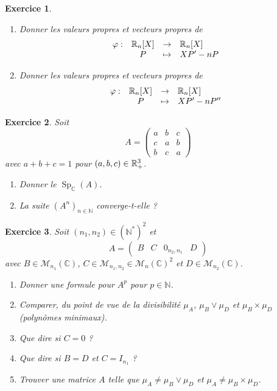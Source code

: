 \documentclass[12pt]{article}
\newtheorem{exercise}{Exercice}[section]
\theoremstyle{remark}
\theoremstyle{remark}
\newcommand{\C}{\mathbb{C}} \newcommand{\Q}{\mathbb{Q}}
\newcommand{\N}{\mathbb{N}} \newcommand{\Z}{\mathbb{Z}}
\newcommand{\M}{\mathcal{M}} \renewcommand{\L}{\mathcal{L}}
\DeclareMathOperator{\Sp}{Sp} \DeclareMathOperator{\mat}{mat}
\newcommand{\function}[5]{
	$$
	\begin{array}{rccl}
		#1: & #2 & \to & #3 \\
		& #4 & \mapsto & #5
	\end{array}
	$$
}
\begin{document}
\begin{exercise}
	\phantom{}
	\begin{enumerate}
		\item Donner les valeurs propres et vecteurs propres de \function{\varphi}{\R_n[X]}{\R_n[X]}{P}{XP'-nP}
		\item Donner les valeurs propres et vecteurs propres de \function{\varphi}{\R_n[X]}{\R_n[X]}{P}{XP'-nP''}
	\end{enumerate}
\end{exercise}

\begin{exercise}
	Soit 
	$$
	A=
	\begin{pmatrix}
		a & b & c\\
		c & a & b\\
		b & c & a
	\end{pmatrix}
	$$
	avec $a+b+c=1$ pour $(a,b,c)\in\mathbb{R}_{+}^{3}$.
	\begin{enumerate}
		\item Donner le $\Sp_{\C}(A)$.
		\item La suite $(A^{n})_{n\in\N}$ converge-t-elle ?
	\end{enumerate}
\end{exercise}

\begin{exercise}
	Soit $(n_{1},n_{2})\in(\N^{*})^{2}$ et
	$$
	A=
	\begin{pmatrix}
		B & C &
		0_{n_{2},n_{1}} & D
	\end{pmatrix}
	$$
	avec $B\in\M_{n_{1}}(\C)$, $C\in\M_{n_{1},n_{2}}\in\M_{n}(\C)^{2}$ et $D\in\M_{n_{2}}(\C)$.
	\begin{enumerate}
		\item Donner une formule pour $A^{p}$ pour $p\in\N$.
		\item Comparer, du point de vue de la divisibilité $\mu_{A}$, $\mu_{B}\vee\mu_{D}$ et $\mu_{B}\times\mu_{D}$ (polynômes minimaux).
		\item Que dire si $C=0$ ?
		\item Que dire si $B=D$ et $C=I_{n_{1}}$ ?
		\item Trouver une matrice $A$ telle que $\mu_{A}\neq \mu_{B}\vee\mu_{D}$ et $\mu_{A}\neq \mu_{B}\times\mu_{D}$.
	\end{enumerate}
\end{exercise}
\end{document}
